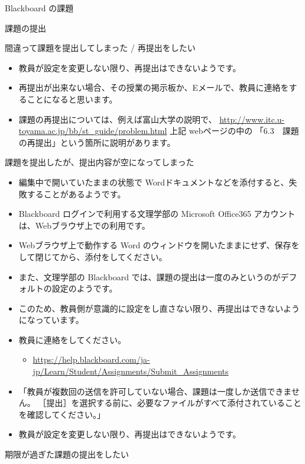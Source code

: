 \documentclass[a4j,10pt]{jsarticle}
\begin{document}
{\begin{frame}[label={sec:org02882cd},fragile]{Blackboard の課題}
\begin{block}{課題の提出}
\begin{block}{間違って課題を提出してしまった / 再提出をしたい}
\begin{itemize}
\par
\item 教員が設定を変更しない限り、再提出はできないようです。
\item 再提出が出来ない場合、その授業の掲示板か、Eメールで、教員に連絡をすることになると思います。
\par
\item 課題の再提出については、例えば富山大学の説明で、
\url{http://www.itc.u-toyama.ac.jp/bb/st\_guide/problem.html}
上記 webページの中の 「6.3　課題の再提出」という箇所に説明があります。
\end{itemize}
\end{block}
\par
\begin{block}{課題を提出したが、提出内容が空になってしまった}
\begin{itemize}
\item 編集中で開いていたままの状態で Wordドキュメントなどを添付すると、失敗することがあるようです。
\item Blackboard ログインで利用する文理学部の Microsoft Office365 アカウントは、Webブラウザ上での利用です。
\item Webブラウザ上で動作する Word のウィンドウを開いたままにせず、保存をして閉じてから、添付をしてください。
\par
\item また、文理学部の Blackboard では、課題の提出は一度のみというのがデフォルトの設定のようです。
\item このため、教員側が意識的に設定をし直さない限り、再提出はできないようになっています。
\item 教員に連絡をしてください。
\begin{itemize}
\item \url{https://help.blackboard.com/ja-jp/Learn/Student/Assignments/Submit\_Assignments}
\end{itemize}
\par
\item 「教員が複数回の送信を許可していない場合、課題は一度しか送信できません。
［提出］を選択する前に、必要なファイルがすべて添付されていることを確認してください。」
\par
\item 教員が設定を変更しない限り、再提出はできないようです。
\end{itemize}
\end{block}
\par
\begin{block}{期限が過ぎた課題の提出をしたい}
\begin{itemize}

\end{itemize}
\end{block}
\end{block}
\end{frame}}
\end{document}
